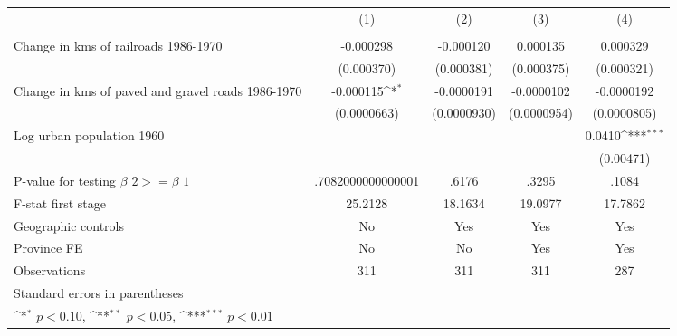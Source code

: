 {
\def\sym#1{\ifmmode^{#1}\else\(^{#1}\)\fi}
\begin{tabular}{l*{4}{c}}
\hline\hline
                &\multicolumn{1}{c}{(1)}&\multicolumn{1}{c}{(2)}&\multicolumn{1}{c}{(3)}&\multicolumn{1}{c}{(4)}\\
                &\multicolumn{1}{c}{}&\multicolumn{1}{c}{}&\multicolumn{1}{c}{}&\multicolumn{1}{c}{}\\
\hline
Change in kms of railroads 1986-1970&-0.000298         &-0.000120         & 0.000135         & 0.000329         \\
                &(0.000370)         &(0.000381)         &(0.000375)         &(0.000321)         \\
[1em]
Change in kms of paved and gravel roads 1986-1970&-0.000115\sym{*}  &-0.0000191         &-0.0000102         &-0.0000192         \\
                &(0.0000663)         &(0.0000930)         &(0.0000954)         &(0.0000805)         \\
[1em]
Log urban population 1960&                  &                  &                  &   0.0410\sym{***}\\
                &                  &                  &                  &(0.00471)         \\
\hline
P-value for testing $\beta\_{2} >= \beta\_{1}$&.7082000000000001         &    .6176         &    .3295         &    .1084         \\
F-stat first stage&  25.2128         &  18.1634         &  19.0977         &  17.7862         \\
Geographic controls&       No         &      Yes         &      Yes         &      Yes         \\
Province FE     &       No         &       No         &      Yes         &      Yes         \\
Observations    &      311         &      311         &      311         &      287         \\
\hline\hline
\multicolumn{5}{l}{\footnotesize Standard errors in parentheses}\\
\multicolumn{5}{l}{\footnotesize \sym{*} \(p<0.10\), \sym{**} \(p<0.05\), \sym{***} \(p<0.01\)}\\
\end{tabular}
}
